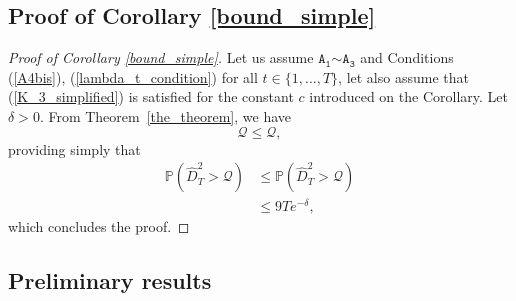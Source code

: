 \documentclass[twoside,11pt]{article}
\newcommand{\PPO}{\mathbb{P} }
\newcommand{\A}[1]{$\mathtt{A_#1}$}
\newcommand{\qmaj}{\mathcal{Q}}
\newcommand{\qmajbis}{\mathscr{Q}}
\begin{document}
\subsection{Proof of Corollary \ref{bound_simple}}
\begin{proof}[Proof of Corollary \ref{bound_simple}]
Let us assume \A{1}$\sim$\A{3} and Conditions (\ref{A4bis}), (\ref{lambda_t_condition}) for all $t \in \{1,\ldots,T\}$, let also assume that  (\ref{K_3_simplified}) is satisfied for the constant $c$ introduced on the Corollary. Let $\delta>0$.
From Theorem~\ref{the_theorem}, we have 
\begin{equation*}
      \qmaj \leq   \qmajbis,
\end{equation*}
providing simply that
\begin{align*}
    \PPO \left(\widehat{D}^2_T > \qmajbis \right) &\leq \PPO \left(\widehat{D}^2_T > \qmaj  \right) \\
    &\leq 9 T e^{-\delta},
\end{align*}
which concludes the proof. 
\end{proof}
\subsection{Preliminary results}
\label{Preliminary_results}
\end{document}
